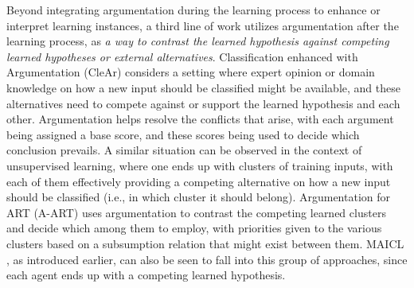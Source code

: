 Beyond integrating argumentation during the learning process to enhance or interpret learning instances, a third line of work utilizes argumentation after the learning process, as \emph{a way to contrast the learned hypothesis against competing learned hypotheses or external alternatives}.
Classification enhanced with Argumentation (CleAr)  considers a setting where expert opinion or domain knowledge on how a new input should be classified might be available, and these alternatives need to compete against or support the learned hypothesis and each other. Argumentation helps resolve the conflicts that arise, with each argument being assigned a base score, and these scores being used to decide which conclusion prevails.
A similar situation can be observed in the context of unsupervised learning, where one ends up with clusters of training inputs, with each of them effectively providing a competing alternative on how a new input should be classified (i.e., in which cluster it should belong). Argumentation for ART (A-ART)  uses argumentation to contrast the competing learned clusters and decide which among them to employ, with priorities given to the various clusters based on a subsumption relation that might exist between them.
MAICL , as introduced earlier, can also be seen to fall into this group of approaches, since each agent ends up with a competing learned hypothesis.

